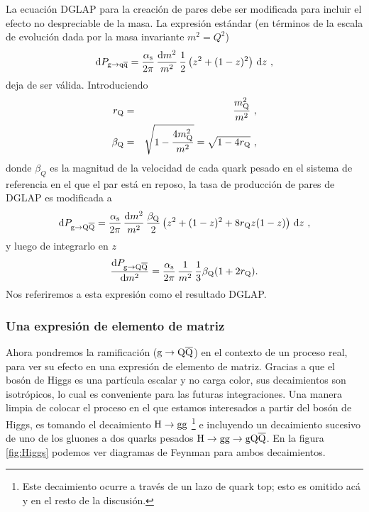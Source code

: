 \documentclass[a4paper,12pt]{article}
\begin{document}
La ecuación DGLAP para la creación de pares debe ser modificada para incluir el efecto no despreciable de la masa. La expresión estándar (en términos de la escala de evolución dada por la masa invariante $m^2=Q^2$)
\begin{equation}
{\mathrm d} P_{{\mathrm g} \to {\mathrm q}\overline{\mathrm q}} = \frac{\alpha_{\mathrm{s}}}{2\pi} \, \frac{{\mathrm d} m^2}{m^2} \,
\frac{1}{2} \left( z^2 + (1 - z)^2 \right) \, {\mathrm d} z ~ ,
\label{eq:DGLAP:gqq}
\end{equation}
deja de ser válida. Introduciendo
\begin{eqnarray}
 r_{{\mathrm Q}} & = & \frac{ m_{{\mathrm Q}}^2 }{ m^2 } ~, \\
\beta_{{\mathrm Q}} & = & \sqrt{ 1 - \frac{ 4 m_{{\mathrm Q}}^2 }{ m^2 } }
   = \sqrt{ 1 - 4 r_{{\mathrm Q}} } ~,
\end{eqnarray}
donde $\beta_Q$ es la magnitud de la velocidad de cada quark pesado en el sistema de referencia en el que el par está en reposo, la tasa de producción de pares de DGLAP es modificada a
\begin{equation}
{\mathrm d} P_{{\mathrm g} \to {\mathrm Q}\overline{\mathrm Q}} = \frac{\alpha_{\mathrm{s}}}{2\pi} \, \frac{{\mathrm d} m^2}{m^2} \,
\frac{\beta_{{\mathrm Q}}}{2} \left( z^2 + (1 - z)^2 + 8 r_{{\mathrm Q}} z (1 - z) \right) 
\, {\mathrm d} z ~ , 
\end{equation}
y luego de integrarlo en $z$
\begin{equation}
\frac{{\mathrm d} P_{{\mathrm g} \to {\mathrm Q}\overline{\mathrm Q}}}{{\mathrm d} m^2} = \frac{\alpha_{\mathrm{s}}}{2\pi} \, \frac{1}{m^2} \,
\frac{1}{3} \beta_{{\mathrm Q}} (1 + 2 r_{{\mathrm Q}}).
\label{m2DGLAP} 
\end{equation}
Nos referiremos a esta expresión como el resultado DGLAP.

\subsubsection{Una expresión de elemento de matriz}

Ahora pondremos la ramificación (${\mathrm g}\to{\mathrm Q}\overline{\mathrm Q}$) en el contexto de un proceso real, para ver su efecto en una expresión de elemento de matriz. Gracias a que el bosón de Higgs es una partícula escalar y no carga color, sus decaimientos son isotrópicos, lo cual es conveniente para las futuras integraciones. Una manera limpia de colocar el proceso en el que estamos interesados a partir del bosón de Higgs, es tomando el decaimiento ${\mathrm H}\to{\mathrm g}{\mathrm g}$ \footnote{Este decaimiento ocurre a través de un lazo de quark top; esto es omitido acá y en el resto de la discusión.} e incluyendo un decaimiento sucesivo de uno de los gluones a dos quarks pesados ${\mathrm H}\to{\mathrm g}{\mathrm g}\to{\mathrm g}{\mathrm Q}\overline{\mathrm Q}$. En la figura \ref{fig:Higgs} podemos ver diagramas de Feynman para ambos decaimientos. 
\end{document}
